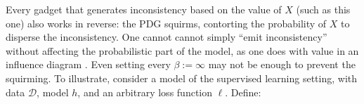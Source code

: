 \documentclass[twoside]{article}
\theoremstyle{plain}
\theoremstyle{definition}
\newcommand{\dg}[1]{\mathbdcal{#1}}
\begin{document}
Every gadget that generates inconsistency based on the value of $X$ (such as this one) also works in reverse: the PDG squirms, contorting the probability of $X$ to disperse the inconsistency.
One cannot cannot simply ``emit inconsistency'' 
without affecting the probabilistic part of the model,
as one does with value in an influence diagram \parencite{influencediagrams}.
%
%
Even setting every $\beta := \infty$ may not be enough to prevent the squirming.
\def\mypdg{\dg{S}}
To illustrate, consider a model of the supervised learning setting, with data $\mathcal D$, model $h$, and an arbitrary loss function $\ell$. Define:
\vspace{-1ex}
\end{document}
